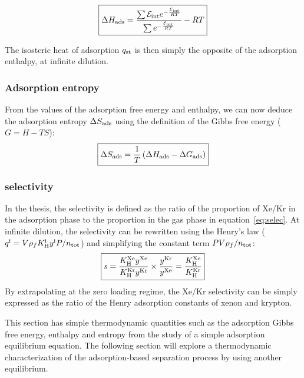 \documentclass[main.tex]{subfiles}
\begin{document}
\begin{equation}\label{eq:ads_enthalpy}
  \boxed{
  \Delta H_{\text{ads}} = \dfrac{\sum \mathcal{E}_{\text{int}}e^{-\frac{\mathcal{E}_{\text{int}}}{RT}}}{\sum e^{-\frac{\mathcal{E}_{\text{int}}}{RT}}} - RT
  }
\end{equation}

The isosteric heat of adsorption $q_{\text{st}}$ is then simply the opposite of the adsorption enthalpy, at infinite dilution. 

\subsubsection{Adsorption entropy}

From the values of the adsorption free energy and enthalpy, we can now deduce the adsorption entropy $\Delta S_{\text{ads}}$ using the definition of the Gibbs free energy ($G = H-TS$):
\begin{equation}\label{eq:ads_entropy}
  \boxed{
  \Delta S_{\text{ads}} = \dfrac{1}{T} \left(\Delta H_{\text{ads}} - \Delta G_{\text{ads}} \right)
  }
\end{equation}

\subsubsection{selectivity}

In the thesis, the selectivity is defined as the ratio of the proportion of Xe/Kr in the adsorption phase to the proportion in the gas phase in equation~\ref{eq:selec}. At infinite dilution, the selectivity can be rewritten using the Henry's law ($q^{\text{i}}=V\rho_f K_{\text{H}}^{\text{i}}y^{\text{i}}P/n_{\text{tot}}$) and simplifying the constant term $PV\rho_f/n_{\text{tot}}$:
\begin{equation}\label{eq:selec_0}
  \boxed{
  s = \dfrac{K_{\text{H}}^{\text{Xe}}y^{\text{Xe}}}{K_{\text{H}}^{\text{Kr}}y^{\text{Kr}}}\times\dfrac{y^{\text{Kr}}}{y^{\text{Xe}}} = \dfrac{K_{\text{H}}^{\text{Xe}}}{K_{\text{H}}^{\text{Kr}}}
  }
\end{equation}
By extrapolating at the zero loading regime, the Xe/Kr selectivity can be simply expressed as the ratio of the Henry adsorption constants of xenon and krypton.

This section has simple thermodynamic quantities such as the adsorption Gibbs free energy, enthalpy and entropy from the study of a simple adsorption equilibrium equation. The following section will explore a thermodynamic characterization of the adsorption-based separation process by using another equilibrium. 
\end{document}
